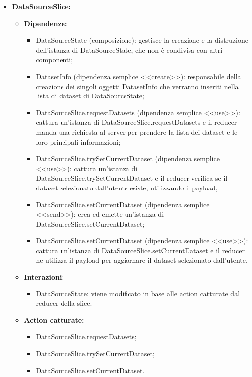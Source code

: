 \begin{itemize}
    \item \textbf{DataSourceSlice:}
          \begin{itemize}
              \item \textbf{Dipendenze:}
                    \begin{itemize}
                        \item DataSourceState (composizione): gestisce la creazione e la distruzione
                              dell'istanza di DataSourceState, che non è condivisa con altri componenti;
                        \item DatasetInfo (dipendenza semplice <<create>>): responsabile della creazione dei
                              singoli oggetti DatasetInfo che verranno inseriti nella lista di dataset di
                              DataSourceState;
                        \item DataSourceSlice.requestDatasets (dipendenza semplice <<use>>): cattura
                              un'istanza di DataSourceSlice.requestDatasets e il reducer manda una richiesta
                              al server per prendere la lista dei dataset e le loro principali informazioni;
                        \item DataSourceSlice.trySetCurrentDataset (dipendenza semplice <<use>>): cattura
                              un'istanza di DataSourceSlice.trySetCurrentDataset e il reducer verifica se il
                              dataset selezionato dall'utente esiste, utilizzando il payload;
                        \item DataSourceSlice.setCurrentDataset (dipendenza semplice <<send>>): crea ed
                              emette un'istanza di DataSourceSlice.setCurrentDataset;
                        \item DataSourceSlice.setCurrentDataset (dipendenza semplice <<use>>): cattura
                              un'istanza di DataSourceSlice.setCurrentDataset e il reducer ne utilizza il
                              payload per aggiornare il dataset selezionato dall'utente.
                    \end{itemize}
              \item \textbf{Interazioni:}
                    \begin{itemize}
                        \item DataSourceState: viene modificato in base alle action catturate dal reducer
                              della slice.
                    \end{itemize}
              \item \textbf{Action catturate:}
                    \begin{itemize}
                        \item DataSourceSlice.requestDatasets;
                        \item DataSourceSlice.trySetCurrentDataset;
                        \item DataSourceSlice.setCurrentDataset.
                    \end{itemize}
          \end{itemize}


\end{itemize}
